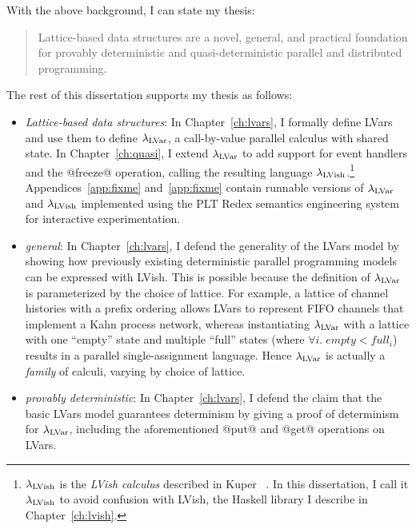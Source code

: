 With the above background, I can state my thesis:
\begin{quote}
  Lattice-based data structures are a novel, general, and practical
  foundation for provably deterministic and quasi-deterministic
  parallel and distributed programming.
\end{quote}
The rest of this dissertation supports my thesis as follows:
\begin{itemize}
  \item \emph{Lattice-based data structures}: In
    Chapter~\ref{ch:lvars}, I formally define LVars and use them to
    define $\lambda_{\textrm{LVar}}$, a call-by-value parallel calculus with
    shared state. In Chapter~\ref{ch:quasi}, I extend $\lambda_{\textrm{LVar}}$ to
    add support for event handlers and the @freeze@ operation, calling
    the resulting language $\lambda_{\textrm{LVish}}$.\footnote{$\lambda_{\textrm{LVish}}$ is
      the \emph{LVish calculus} described in Kuper
      \etal~\cite{Freeze-paper}.  In this dissertation, I call it
      $\lambda_{\textrm{LVish}}$ to avoid confusion with LVish, the Haskell
      library I describe in Chapter~\ref{ch:lvish}.}
    Appendices~\ref{app:fixme} and~\ref{app:fixme} contain runnable versions of $\lambda_{\textrm{LVar}}$ and
    $\lambda_{\textrm{LVish}}$ implemented using the PLT Redex semantics
    engineering system~\cite{redex-book} for interactive
    experimentation.

  \item \emph{general}: In Chapter~\ref{ch:lvars}, I defend the
    generality of the LVars model by showing how previously existing
    deterministic parallel programming models can be expressed with
    LVish.  This is possible because the definition of $\lambda_{\textrm{LVar}}$
    is parameterized by the choice of lattice.  For example, a lattice
    of channel histories with a prefix ordering allows LVars to
    represent FIFO channels that implement a Kahn process network,
    whereas instantiating $\lambda_{\textrm{LVar}}$ with a lattice with one
    ``empty'' state and multiple ``full'' states (where $\forall{i}.\;
    \mathit{empty} < \mathit{full_i}$) results in a parallel
    single-assignment language.  Hence $\lambda_{\textrm{LVar}}$ is actually a
    \emph{family} of calculi, varying by choice of lattice.

  \item \emph{provably deterministic}: In Chapter~\ref{ch:lvars}, I
    defend the claim that the basic LVars model guarantees determinism
    by giving a proof of determinism for $\lambda_{\textrm{LVar}}$, including the
    aforementioned @put@ and @get@ operations on LVars.  


\end{itemize}
